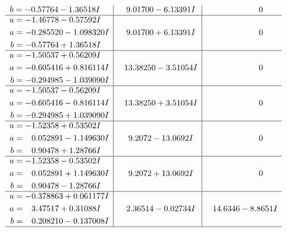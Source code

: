 \documentclass[1p]{elsarticle_modified}
\theoremstyle{definition}
\begin{document}
$$\begin{array}{c|c|c}
\begin{aligned}
b &= -0.57764 - 1.36518 I\end{aligned}
 & \phantom{-}9.01700 - 6.13391 I & \phantom{-0.000000 } 0 \\ \hline\begin{aligned}
u &= -1.46778 - 0.57592 I \\
a &= -0.285520 - 1.098320 I \\
b &= -0.57764 + 1.36518 I\end{aligned}
 & \phantom{-}9.01700 + 6.13391 I & \phantom{-0.000000 } 0 \\ \hline\begin{aligned}
u &= -1.50537 + 0.56209 I \\
a &= -0.605416 + 0.816114 I \\
b &= -0.294985 - 1.039090 I\end{aligned}
 & \phantom{-}13.38250 - 3.51054 I & \phantom{-0.000000 } 0 \\ \hline\begin{aligned}
u &= -1.50537 - 0.56209 I \\
a &= -0.605416 - 0.816114 I \\
b &= -0.294985 + 1.039090 I\end{aligned}
 & \phantom{-}13.38250 + 3.51054 I & \phantom{-0.000000 } 0 \\ \hline\begin{aligned}
u &= -1.52358 + 0.53502 I \\
a &= \phantom{-}0.052891 - 1.149630 I \\
b &= \phantom{-}0.90478 + 1.28766 I\end{aligned}
 & \phantom{-}9.2072 - 13.0692 I & \phantom{-0.000000 } 0 \\ \hline\begin{aligned}
u &= -1.52358 - 0.53502 I \\
a &= \phantom{-}0.052891 + 1.149630 I \\
b &= \phantom{-}0.90478 - 1.28766 I\end{aligned}
 & \phantom{-}9.2072 + 13.0692 I & \phantom{-0.000000 } 0 \\ \hline\begin{aligned}
u &= -0.378863 + 0.061177 I \\
a &= \phantom{-}3.47517 + 0.31088 I \\
b &= \phantom{-}0.208210 - 0.137008 I\end{aligned}
 & \phantom{-}2.36514 - 0.02734 I & \phantom{-}14.6346 - 8.8651 I\\
 \hline 
 \end{array}$$\newpage$$\begin{array}{c|c|c}  

\end{array}$$
\end{document}
